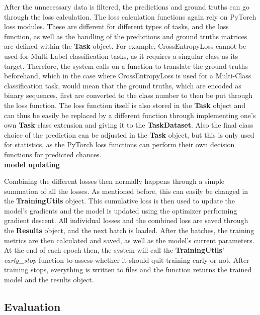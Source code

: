 After the unnecessary data is filtered, the predictions and ground truths can go through the loss calculation. The loss calculation functions again rely on PyTorch loss modules. These are different for different types of tasks, and the loss function, as well as the handling of the predictions and ground truths matrices are defined within the \textbf{Task} object. For example, CrossEntropyLoss cannot be used for Multi-Label classification tasks, as it requires a singular class as its target. Therefore, the system calls on a function to translate the ground truths beforehand, which in the case where CrossEntropyLoss is used for a Multi-Class classification task, would mean that the ground truths, which are encoded as binary sequences, first are converted to the class number to then be put through the loss function. The loss function itself is also stored in the \textbf{Task} object and can thus be easily be replaced by a different function through implementing one's own \textbf{Task} class extension and giving it to the \textbf{TaskDataset}. Also the final class choice of the prediction can be adjusted in the \textbf{Task} object, but this is only used for statistics, as the PyTorch loss functions can perform their own decision functions for predicted chances. \\

\textbf{model updating}

Combining the different losses then normally happens through a simple summation of all the losses. As mentioned before, this can easily be changed in the \textbf{TrainingUtils} object. This cumulative loss is then used to update the model's gradients and the model is updated using the optimizer performing gradient descent. All individual losses and the combined loss are saved through the \textbf{Results} object, and the next batch is loaded. After the batches, the training metrics are then calculated and saved, as well as the model's current parameters.\\

At the end of each epoch then, the system will call the \textbf{TrainingUtils}' \textit{early\_stop} function to assess whether it should quit training early or not. After training stops, everything is written to files and the function returns the trained model and the results object.\\

\subsection{Evaluation} \label{Impl:Training:Evaluation}

